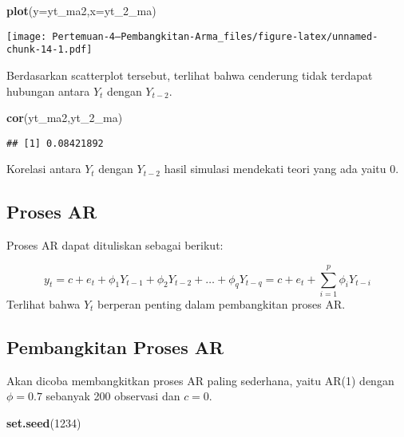 \documentclass[
]{article}
\newenvironment{Shaded}{\begin{snugshade}}{\end{snugshade}}
\newcommand{\AttributeTok}[1]{\textcolor[rgb]{0.13,0.29,0.53}{#1}}
\newcommand{\DecValTok}[1]{\textcolor[rgb]{0.00,0.00,0.81}{#1}}
\newcommand{\FunctionTok}[1]{\textcolor[rgb]{0.13,0.29,0.53}{\textbf{#1}}}
\newcommand{\NormalTok}[1]{#1}
\begin{document}
\begin{Shaded}
\begin{Highlighting}[]
\FunctionTok{plot}\NormalTok{(}\AttributeTok{y=}\NormalTok{yt\_ma2,}\AttributeTok{x=}\NormalTok{yt\_2\_ma)}
\end{Highlighting}
\end{Shaded}

\texttt{[image: Pertemuan-4---Pembangkitan-Arma\_files/figure-latex/unnamed-chunk-14-1.pdf]}

Berdasarkan scatterplot tersebut, terlihat bahwa cenderung tidak
terdapat hubungan antara \(Y_t\) dengan \(Y_{t-2}\).

\begin{Shaded}
\begin{Highlighting}[]
\FunctionTok{cor}\NormalTok{(yt\_ma2,yt\_2\_ma)}
\end{Highlighting}
\end{Shaded}

\begin{verbatim}
## [1] 0.08421892
\end{verbatim}

Korelasi antara \(Y_t\) dengan \(Y_{t-2}\) hasil simulasi mendekati
teori yang ada yaitu 0.

\subsection{Proses AR}\label{proses-ar}

Proses AR dapat dituliskan sebagai berikut:

\[ y_{t} = c + e_t + \phi_{1}Y_{t-1} + \phi_{2}Y_{t-2} + \dots + \phi_{q}Y_{t-q} = c+{e_t+\sum_{i=1}^p \phi_iY_{t-i}} \]
Terlihat bahwa \(Y_t\) berperan penting dalam pembangkitan proses AR.

\subsection{Pembangkitan Proses AR}\label{pembangkitan-proses-ar}

Akan dicoba membangkitkan proses AR paling sederhana, yaitu AR(1) dengan
\(\phi = 0.7\) sebanyak 200 observasi dan \(c=0\).

\begin{Shaded}
\begin{Highlighting}[]
\FunctionTok{set.seed}\NormalTok{(}\DecValTok{1234}\NormalTok{)}
\end{Highlighting}
\end{Shaded}
\end{document}
